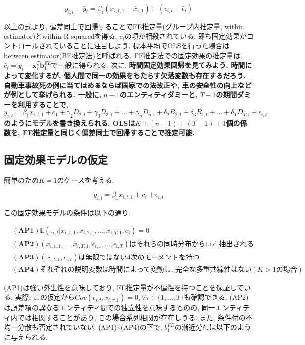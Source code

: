 \documentclass[paper=a4paper,fontsize=10pt]{jlreq}
\begin{document}
\begin{equation*}
  y_{i,t} - \bar{y}_i = \beta_1 ({x}_{i,t,1} - \bar{x}_{i,1}) + (\epsilon_{i,t} - \bar{\epsilon}_i)
\end{equation*}

以上の式より, 偏差同士で回帰することでFE推定量(グループ内推定量, within estimator)とwithin R squaredを得る. $c_i$の項が相殺されている, 即ち固定効果がコントロールされていることに注目しよう. 標本平均でOLSを行った場合はbetween estimator(BE推定法)と呼ばれる. FE推定法での固定効果の推定量は$\hat{c}_i = \bar{y}_i - \bar{\mathbf{x}}_{i}^T \mathbf{b}_1^{FE}$で一般に得られる. 次に, \rmfamily\mcfamily\bfseries{時間固定効果回帰}\mdseries を見てみよう. 時間によって変化するが, 個人間で同一の効果をもたらす欠落変数も存在するだろう. 自動車事故死の例に当てはめるならば国家での法改正や, 車の安全性の向上などが例として挙げられる. 一般に, $n - 1$のエンティティダミーと, $T - 1$の期間ダミーを利用することで, $y_{i,t} = \beta_1 x_{i,t,1} + c_1 + \gamma_2 D_{2,i} + \gamma_3 D_{3,i} + \dots + \gamma_n D_{n,i} + \delta_2 B_{2,t} + \delta_3 B_{3,t} + \dots + \delta_T D_{T,t}+ \epsilon_{i,t}$のようにモデルを書き換えられる. OLSは$K + (n - 1) + (T - 1) + 1$個の係数を, FE推定量と同じく偏差同士で回帰することで推定可能.\\

\subsection{固定効果モデルの仮定}
簡単のため$K = 1$のケースを考える.

\begin{equation*}
  y_{i,t} = \beta_1 {x}_{i,t,1} + c_i + \epsilon_{i,t}
\end{equation*}

この固定効果モデルの条件は以下の通り.

\begin{align*}
  &\mathbf{(AP1)}　\mathbb{E}(\epsilon_{i,t}|x_{i,1,1}, x_{i,2,1}, \dots, x_{i,T,1}, c_i)=0\\
  &\mathbf{(AP2)}　(x_{i,1,1}, \dots, x_{i,T,1}, \epsilon_{i,1}, \dots, \epsilon_{i,T}) \text{はそれらの同時分布からi.i.d.抽出される}\\
  &\mathbf{(AP3)}　(x_{i,t,1}, \epsilon_{i,t})\text{は無限ではない4次のモーメントを持つ}\\
  &\mathbf{(AP4)}　\text{それぞれの説明変数は時間によって変動し, 完全な多重共線性はない} (K > 1の場合)
\end{align*}

(AP1)は強い外生性を意味しており, FE推定量が不偏性を持つことを保証している. 実際, この仮定から$Cov(\epsilon_{i,t}, x_{i,\tau,1}) = 0, \forall\tau\in\{1,\dots,T\}$も確認できる. (AP2)は誤差項の異なるエンティティ間での独立性を意味するものの, 同一エンティティ内では相関することがあり, この場合系列相関が存在しうる. また, 条件付の不均一分散も否定されていない. (AP1)\sim(AP4)の下で, $b_1^{FE}$の漸近分布は以下のように与えられる.
\end{document}
